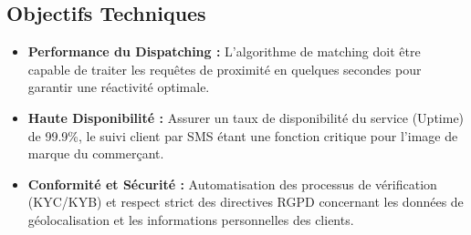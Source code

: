 \subsection{Objectifs Techniques}
\begin{itemize}
    \item \textbf{Performance du Dispatching :} L'algorithme de matching doit être capable de traiter les requêtes de proximité en quelques secondes pour garantir une réactivité optimale.
    \item \textbf{Haute Disponibilité :} Assurer un taux de disponibilité du service (Uptime) de 99.9\%, le suivi client par SMS étant une fonction critique pour l'image de marque du commerçant.
    
    \item \textbf{Conformité et Sécurité :} Automatisation des processus de vérification (KYC/KYB) et respect strict des directives RGPD concernant les données de géolocalisation et les informations personnelles des clients.
\end{itemize}

